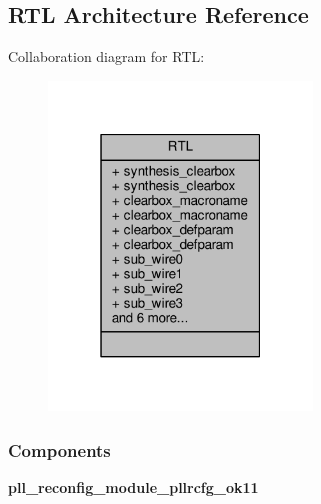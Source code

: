 \subsection{R\+TL Architecture Reference}
\label{classpll__reconfig__module_1_1RTL}


Collaboration diagram for R\+TL\+:\nopagebreak
\begin{figure}[H]
\begin{center}
\leavevmode
\includegraphics[width=199pt]{d8/d18/classpll__reconfig__module_1_1RTL__coll__graph}
\end{center}
\end{figure}
\subsubsection*{Components}
 \begin{DoxyCompactItemize}
\item 
{\bf pll\+\_\+reconfig\+\_\+module\+\_\+pllrcfg\+\_\+ok11}  {\bfseries }  
\end{DoxyCompactItemize}
